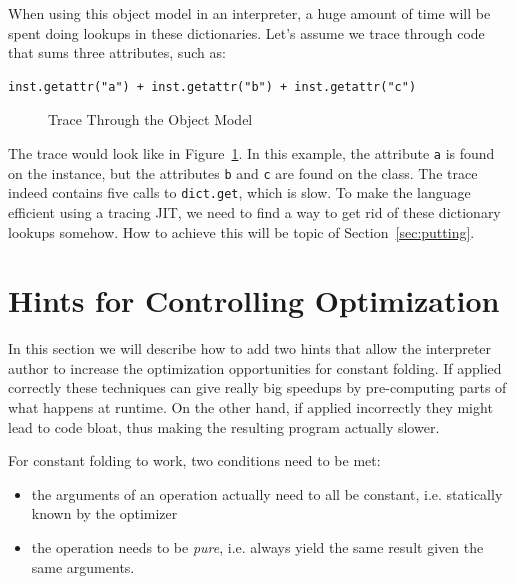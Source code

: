 \documentclass{sig-alternate}
\begin{document}
When using this object model in
an interpreter, a huge amount of time will be spent doing lookups in these
dictionaries.
Let's assume we trace through code that sums three attributes, such as:

\begin{Verbatim}
inst.getattr("a") + inst.getattr("b") + inst.getattr("c")
\end{Verbatim}

\begin{figure}

\caption{Trace Through the Object Model}
\label{fig:trace1}
\end{figure}

The trace would look like in Figure~\ref{fig:trace1}. In this example, the
attribute \texttt{a} is found on the instance, but the
attributes \texttt{b} and \texttt{c} are found on the class. The trace indeed contains
five calls to \texttt{dict.get}, which is slow. To make the language efficient
using a tracing JIT, we need to find a way to get rid of these dictionary
lookups somehow. How to achieve this will be topic of
Section~\ref{sec:putting}.






\section{Hints for Controlling Optimization}
\label{sec:hints}

In this section we will describe how to add two hints that allow the
interpreter author to increase the optimization opportunities for constant
folding. If applied correctly these techniques can give really big speedups by
pre-computing parts of what happens at runtime. On the other
hand, if applied incorrectly they might lead to code bloat, thus making the
resulting program actually slower.

For constant folding to work, two conditions need to be met:

\begin{itemize}
    \item the arguments of an operation actually need to all be constant,
    i.e. statically known by the optimizer
    \item the operation needs to be \emph{pure}, i.e. always yield the same result given
    the same arguments.
\end{itemize}
\end{document}
